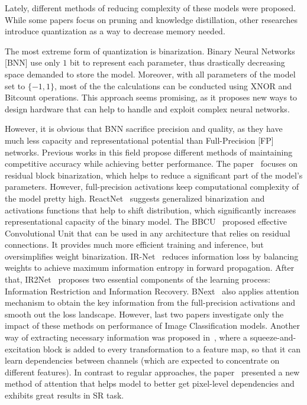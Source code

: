 \documentclass{article}
\begin{document}
Lately, different methods of reducing complexity of these models were proposed. While some papers focus on pruning and knowledge distillation, other researches introduce quantization as a way to decrease memory needed.

The most extreme form of quantization is binarization. Binary Neural Networks [BNN] use only $1$ bit to represent each parameter, thus drastically decreasing space demanded to store the model. Moreover, with all parameters of the model set to $\{-1, 1\}$, most of the the calculations can be conducted using XNOR and Bitcount operations. This approach seems promising, as it proposes new ways to design hardware that can help to handle and exploit complex neural networks.

However, it is obvious that BNN sacrifice precision and quality, as they have much less capacity and representational potential than Full-Precision [FP] networks. Previous works in this field propose different methods of maintaining competitive accuracy while achieving better performance. The paper~\cite{ma2019efficient} focuses on residual block binarization, which helps to reduce a significant part of the model's parameters. However, full-precision activations keep computational complexity of the model pretty high. ReactNet~\cite{liu2020reactnet} suggests generalized binarization and activations functions that help to shift distribution, which significantly increases representational capacity of the binary model. The BBCU~\cite{xia2022basic} proposed effective Convolutional Unit that can be used in any architecture that relies on residual connections. It provides much more efficient training and inference, but oversimplifies weight binarization. IR-Net~\cite{qin2020forward} reduces information loss by balancing weights to achieve maximum information entropy in forward propagation. After that, IR2Net~\cite{xue2022ir2net} proposes two essential components of the learning process: Information Restriction and Information Recovery. BNext~\cite{guo2022join} also applies attention mechanism to obtain the key information from the full-precision activations and smooth out the loss landscape. 
However, last two papers investigate only the impact of these methods on performance of Image Classification models. Another way of extracting necessary information was proposed in~\cite{hu2018squeeze}, where a squeeze-and-excitation block is added to every transformation to a feature map, so that it can learn dependencies between channels (which are expected to concentrate on different features). In contrast to regular approaches, the paper~\cite{zhao2020efficient} presented a new method of attention that helps model to better get pixel-level dependencies and exhibits great results in SR task.
\end{document}
